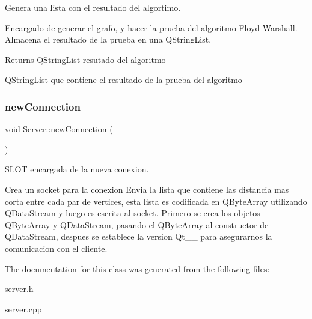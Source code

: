 Genera una lista con el resultado del algortimo. 

Encargado de generar el grafo, y hacer la prueba del algoritmo Floyd-\/\+Warshall. Almacena el resultado de la prueba en una Q\+String\+List.

\begin{DoxyReturn}{Returns}
Q\+String\+List resutado del algoritmo

Q\+String\+List que contiene el resultado de la prueba del algoritmo 
\end{DoxyReturn}
\mbox{\label{classServer_a4caf81e22e3a0535dd5955b422b897f0}} 
\subsubsection{\texorpdfstring{new\+Connection}{newConnection}}
{\footnotesize\ttfamily void Server\+::new\+Connection (\begin{DoxyParamCaption}{ }\end{DoxyParamCaption})\hspace{0.3cm}{\ttfamily [slot]}}



S\+L\+OT encargada de la nueva conexion. 

Crea un socket para la conexion Envia la lista que contiene las distancia mas corta entre cada par de vertices, esta lista es codificada en Q\+Byte\+Array utilizando Q\+Data\+Stream y luego es escrita al socket. Primero se crea los objetos Q\+Byte\+Array y Q\+Data\+Stream, pasando el Q\+Byte\+Array al constructor de Q\+Data\+Stream, despues se establece la version Qt\+\_\+\_ para asegurarnos la comunicacion con el cliente. 

The documentation for this class was generated from the following files\+:\begin{DoxyCompactItemize}
\item 
server.\+h\item 
server.\+cpp\end{DoxyCompactItemize}
